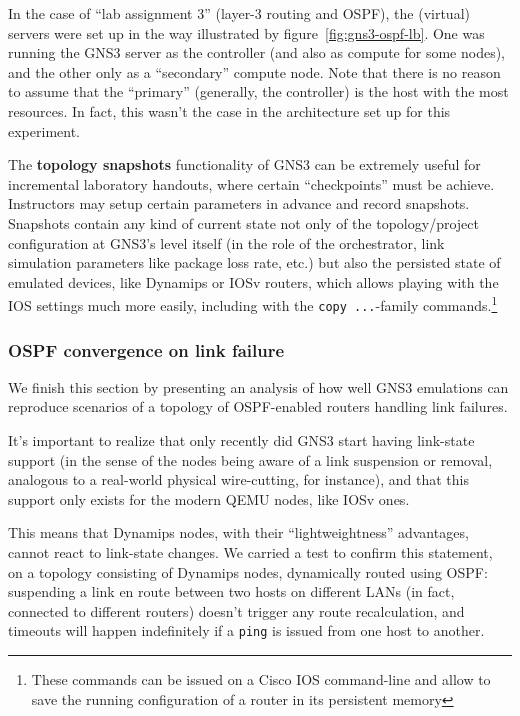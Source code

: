 In the case of ``lab assignment 3'' (layer-3 routing and OSPF), the (virtual) servers were set up in the way illustrated by figure~\ref{fig:gns3-ospf-lb}.
One was running the GNS3 server as the controller (and also as compute for some nodes), and the other only as a ``secondary'' compute node.
Note that there is no reason to assume that the ``primary'' (generally, the controller) is the host with the most resources.
In fact, this wasn't the case in the architecture set up for this experiment.

The \textbf{topology snapshots} functionality of GNS3 can be extremely useful for incremental laboratory handouts, where certain ``checkpoints'' must be achieve.
Instructors may setup certain parameters in advance and record snapshots.
Snapshots contain any kind of current state not only of the topology/project configuration at GNS3's level itself (in the role of the orchestrator, link simulation parameters like package loss rate, etc.) but also the persisted state of emulated devices, like Dynamips or IOSv routers, which allows playing with the IOS settings much more easily, including with the \texttt{copy ...}-family commands.\footnote{These commands can be issued on a Cisco IOS command-line and allow to save the running configuration of a router in its persistent memory}



\subsubsection{OSPF convergence on link failure}

We finish this section by presenting an analysis of how well GNS3 emulations can reproduce scenarios of a topology of OSPF-enabled routers handling link failures.

It's important to realize that only recently did GNS3 start having link-state support (in the sense of the nodes being aware of a link suspension or removal, analogous to a real-world physical wire-cutting, for instance), and that this support only exists for the modern QEMU nodes, like IOSv ones.

This means that Dynamips nodes, with their ``lightweightness'' advantages, cannot react to link-state changes. We carried a test to confirm this statement, on a topology consisting of Dynamips nodes, dynamically routed using OSPF: suspending a link en route between two hosts on different LANs (in fact, connected to different routers) doesn't trigger any route recalculation, and timeouts will happen indefinitely if a \texttt{ping} is issued from one host to another.

